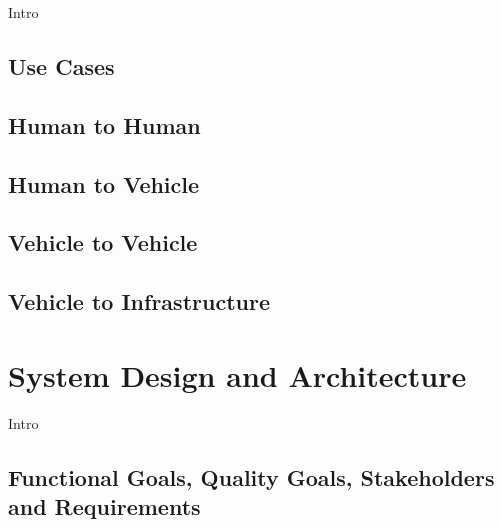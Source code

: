 \documentclass{llncs}
\begin{document}
{		Intro


		
		\subsection{Use Cases}
			\label{ss:use-cases}
			
			\subsection{Human to Human}

			\subsection{Human to Vehicle}
		
			\subsection{Vehicle to Vehicle}
			
			\subsection{Vehicle to Infrastructure}					
		


	
	
	\section{System Design and Architecture}
		\label{section-4}	

		Intro
		
		
		\subsection{Functional Goals, Quality Goals, Stakeholders and Requirements}
			\label{ss:requirement-engineering}
			
}
\end{document}

